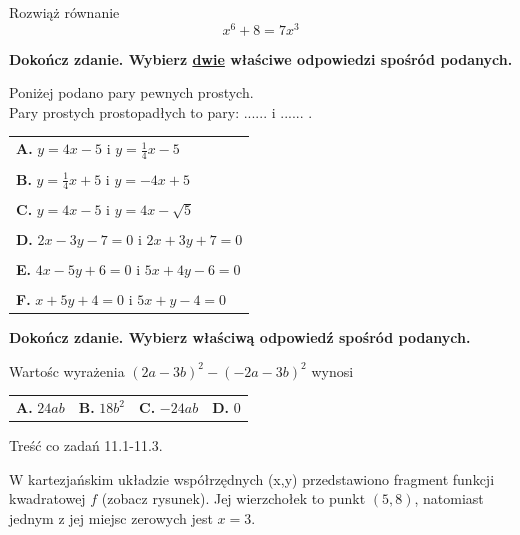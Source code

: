 \documentclass[12pt,a4paper]{article}
\theoremstyle{break}
\begin{document}
	\begin{zad}[0-3]
		Rozwiąż równanie
		$$x^6+8=7x^3$$
	\end{zad} 

	\begin{zad}[0-2]
		\textbf{Dokończ zdanie. Wybierz \underline{dwie} właściwe odpowiedzi spośród podanych.}
	\end{zad} 

	Poniżej podano pary pewnych prostych.
	\\
	
	Pary prostych prostopadłych to pary: ...... i ...... .
	
	\vspace{0.5cm}
	\begin{tabular}{p{14cm}}
		\textbf{A. }$y=4x-5$ i $y=\frac{1}{4}x-5$\\
		\\
		\textbf{B. }$y=\frac{1}{4}x+5$ i $y=-4x+5$\\
		\\
		\textbf{C. }$y=4x-5$ i $y=4x-\sqrt{5}$\\
		\\
		\textbf{D. }$2x-3y-7=0$ i $2x+3y+7=0$\\
		\\
		\textbf{E. }$4x-5y+6=0$ i $5x+4y-6=0$\\
		\\
		\textbf{F. }$x+5y+4=0$ i $5x+y-4=0$\\
	\end{tabular}
		
		
		\begin{zad}[0-1]
			\textbf{Dokończ zdanie. Wybierz właściwą odpowiedź spośród podanych.}
		\end{zad} 
		
		Wartośc wyrażenia $(2a-3b)^2-(-2a-3b)^2$ wynosi
		
		\vspace{0.5cm}
		\begin{tabular}{p{3.5cm} p{3.5cm} p{3.5cm} p{3.5cm}}
			\textbf{A. }$24ab$&
			\textbf{B. }$18b^2$&
			\textbf{C. }$-24ab$&
			\textbf{D. }$0$\\
		\end{tabular}
	
		\newpage
		\begin{zad}
			Treść co zadań 11.1-11.3.
		\end{zad}
	
		W kartezjańskim układzie współrzędnych (x,y) przedstawiono fragment funkcji kwadratowej $f$ (zobacz rysunek). Jej wierzchołek to punkt $(5,8)$, natomiast jednym z jej miejsc zerowych jest $x=3$.
		
\end{document}
